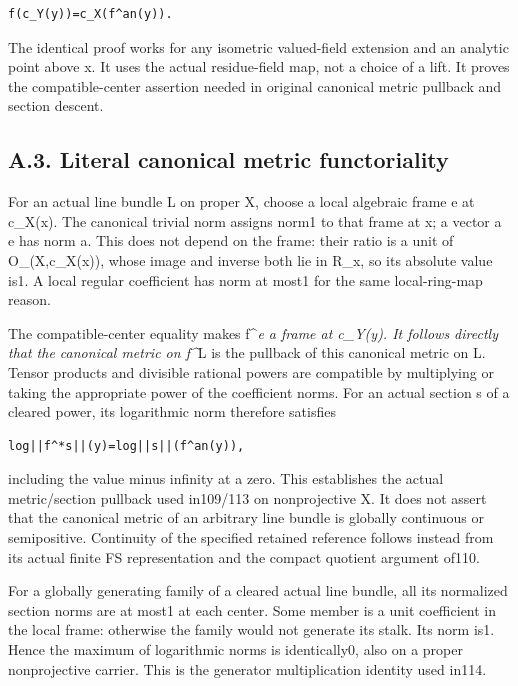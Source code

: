 \documentclass[
  10pt,
]{article}
\begin{document}
\begin{verbatim}
f(c_Y(y))=c_X(f^an(y)).
\end{verbatim}

The identical proof works for any isometric valued-field extension and
an analytic point above x. It uses the actual residue-field map, not a
choice of a lift. It proves the compatible-center assertion needed in
original canonical metric pullback and section descent.

\subsection{A.3. Literal canonical metric
functoriality}\label{a.3.-literal-canonical-metric-functoriality}

For an actual line bundle L on proper X, choose a local algebraic frame
e at c\_X(x). The canonical trivial norm assigns norm1 to that frame at
x; a vector a e has norm \textbar a\textbar. This does not depend on the
frame: their ratio is a unit of O\_(X,c\_X(x)), whose image and inverse
both lie in R\_x, so its absolute value is1. A local regular coefficient
has norm at most1 for the same local-ring-map reason.

The compatible-center equality makes f\^{}\emph{e a frame at c\_Y(y). It
follows directly that the canonical metric on f\^{}}L is the pullback of
this canonical metric on L. Tensor products and divisible rational
powers are compatible by multiplying or taking the appropriate power of
the coefficient norms. For an actual section s of a cleared power, its
logarithmic norm therefore satisfies

\begin{verbatim}
log||f^*s||(y)=log||s||(f^an(y)),
\end{verbatim}

including the value minus infinity at a zero. This establishes the
actual metric/section pullback used in109/113 on nonprojective X. It
does not assert that the canonical metric of an arbitrary line bundle is
globally continuous or semipositive. Continuity of the specified
retained reference follows instead from its actual finite FS
representation and the compact quotient argument of110.

For a globally generating family of a cleared actual line bundle, all
its normalized section norms are at most1 at each center. Some member is
a unit coefficient in the local frame: otherwise the family would not
generate its stalk. Its norm is1. Hence the maximum of logarithmic norms
is identically0, also on a proper nonprojective carrier. This is the
generator multiplication identity used in114.
\end{document}
